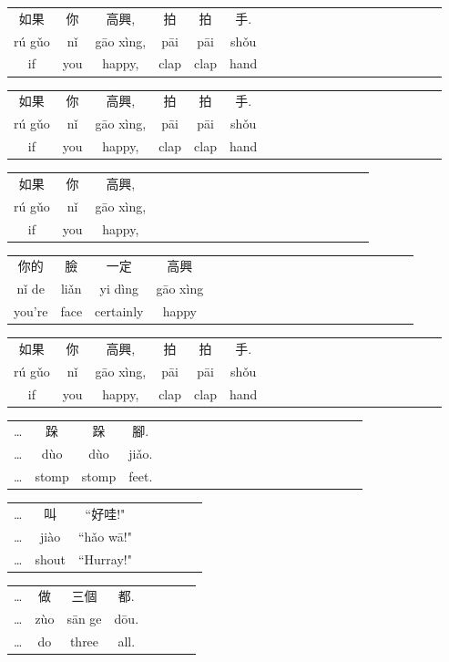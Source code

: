 \begin{tabular}{*{20}{c}}
   如果         & 你     & 高興,         & 拍    & 拍    & 手.      \\
   r\'u g\v{u}o & n\v{i} & g\=ao x\`ing, & p\=ai & p\=ai & sh\v{o}u \\
   if           & you    & happy,        & clap  & clap  & hand
\end{tabular}

\begin{tabular}{*{20}{c}}
   如果         & 你     & 高興,         & 拍    & 拍    & 手.      \\
   r\'u g\v{u}o & n\v{i} & g\=ao x\`ing, & p\=ai & p\=ai & sh\v{o}u \\
   if           & you    & happy,        & clap  & clap  & hand
\end{tabular}

\begin{tabular}{*{20}{c}}
   如果         & 你     & 高興,           \\
   r\'u g\v{u}o & n\v{i} & g\=ao x\`ing,   \\
   if           & you    & happy,        
\end{tabular}

\begin{tabular}{*{20}{c}}
   你的      & 臉       & 一定      & 高興          \\
   n\v{i} de & li\v{a}n & yi d\`ing & g\=ao x\`ing  \\
   you're    & face     & certainly & happy
\end{tabular}

\begin{tabular}{*{20}{c}}
   如果         & 你     & 高興,         & 拍    & 拍    & 手.      \\
   r\'u g\v{u}o & n\v{i} & g\=ao x\`ing, & p\=ai & p\=ai & sh\v{o}u \\
   if           & you    & happy,        & clap  & clap  & hand
\end{tabular}

\begin{tabular}[t]{*{20}{c}}
   \ldots & 跺     & 跺      & 腳.       \\
   \ldots & d\`uo  & d\`uo   & ji\v{a}o. \\
   \ldots & stomp  & stomp   & feet. 
\end{tabular}
\hfill
\begin{tabular}[t]{*{8}{c}}
   \ldots & 叫      & ``好哇!"          \\
   \ldots & ji\`ao  & ``h\v{a}o w\=a!"  \\
   \ldots & shout   & ``Hurray!"
\end{tabular}

\begin{tabular}{*{8}{c}}
   \ldots & 做      & 三個     & 都.      \\      
   \ldots & z\`{u}o & s\=an ge & d\={o}u. \\
   \ldots & do      & three    & all.
\end{tabular}




